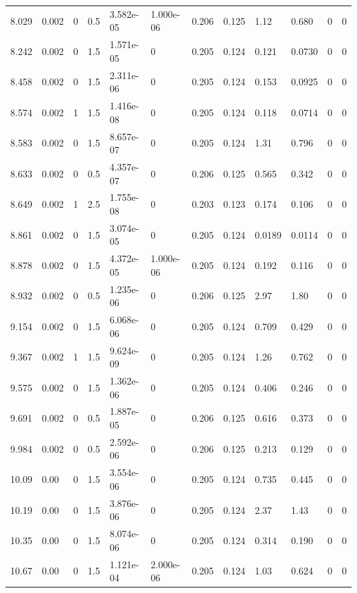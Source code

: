 \documentclass[preview]{standalone}
\begin{document}
{{{\begin{tabular}{L{1.2cm}C{1.2cm} C{0.3cm}C{0.5cm} C{1.4cm}C{1.4cm} C{1.4cm}C{1.4cm} C{1.6cm}C{1.6cm} C{1.6cm}C{1.6cm}}
  8.029  &  0.002  & 0     & 0.5 &  3.582e-05  & 1.000e-06  &  0.206&   0.125& 1.12 & 0.680   &  0 & 0  \\ 
  8.242  &  0.002  & 0     & 1.5 &  1.571e-05  & 0  &  0.205&   0.124& 0.121 & 0.0730   &  0 & 0  \\ 
  8.458  &  0.002  & 0     & 1.5 &  2.311e-06  & 0  &  0.205&   0.124& 0.153 & 0.0925   &  0 & 0  \\ 
  8.574  &  0.002  & 1     & 1.5 &  1.416e-08  & 0  &  0.205&   0.124& 0.118 & 0.0714   &  0 & 0  \\ 
  8.583  &  0.002  & 0     & 1.5 &  8.657e-07  & 0  &  0.205&   0.124& 1.31 & 0.796   &  0 & 0  \\ 
  8.633  &  0.002  & 0     & 0.5 &  4.357e-07  & 0  &  0.206&   0.125& 0.565 & 0.342   &  0 & 0  \\ 
  8.649  &  0.002  & 1     & 2.5 &  1.755e-08  & 0  &  0.203&   0.123& 0.174 & 0.106   &  0 & 0  \\ 
  8.861  &  0.002  & 0     & 1.5 &  3.074e-05  & 0  &  0.205&   0.124& 0.0189 & 0.0114   &  0 & 0  \\ 
  8.878  &  0.002  & 0     & 1.5 &  4.372e-05  & 1.000e-06  &  0.205&   0.124& 0.192 & 0.116   &  0 & 0  \\ 
  8.932  &  0.002  & 0     & 0.5 &  1.235e-06  & 0  &  0.206&   0.125& 2.97 & 1.80   &  0 & 0  \\ 
  9.154  &  0.002  & 0     & 1.5 &  6.068e-06  & 0  &  0.205&   0.124& 0.709 & 0.429   &  0 & 0  \\ 
  9.367  &  0.002  & 1     & 1.5 &  9.624e-09  & 0  &  0.205&   0.124& 1.26 & 0.762   &  0 & 0  \\ 
  9.575  &  0.002  & 0     & 1.5 &  1.362e-06  & 0  &  0.205&   0.124& 0.406 & 0.246   &  0 & 0  \\ 
  9.691  &  0.002  & 0     & 0.5 &  1.887e-05  & 0  &  0.206&   0.125& 0.616 & 0.373   &  0 & 0  \\ 
  9.984  &  0.002  & 0     & 0.5 &  2.592e-06  & 0  &  0.206&   0.125& 0.213 & 0.129   &  0 & 0  \\ 
  10.09  &  0.00  & 0     & 1.5 &  3.554e-06  & 0  &  0.205&   0.124& 0.735 & 0.445   &  0 & 0  \\ 
  10.19  &  0.00  & 0     & 1.5 &  3.876e-06  & 0  &  0.205&   0.124& 2.37 & 1.43   &  0 & 0  \\ 
  10.35  &  0.00  & 0     & 1.5 &  8.074e-06  & 0  &  0.205&   0.124& 0.314 & 0.190   &  0 & 0  \\ 
  10.67  &  0.00  & 0     & 1.5 &  1.121e-04  & 2.000e-06  &  0.205&   0.124& 1.03 & 0.624   &  0 & 0  \\ 

\end{tabular}}}}
\end{document}
